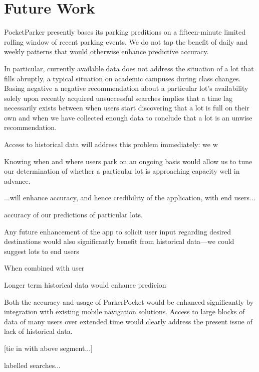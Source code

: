 \section{Future Work}
\label{sec-future}



PocketParker presently bases its parking preditions on a fifteen-minute 
limited rolling window of recent parking events. We do not tap the benefit
of daily and weekly patterns that would otherwise enhance predictive accuracy.

In particular, currently available data does not address the situation of a
lot that fills abruptly, a typical situation on academic campuses during
class changes. Basing negative a negative recommendation about a particular
lot's availability solely upon recently acquired unsuccessful searches implies
that a time lag necessarily exists between when users start discovering that
a lot is full on their own and when we have collected enough data to conclude
that a lot is an unwise recommendation.

Access to historical data will address this problem immediately:  we w

Knowing when and where users park on an ongoing basis would allow us to tune
our determination of whether a particular lot is approaching capacity well
in advance.  


...will enhance accuracy, and hence credibility of the application, with end users...

accuracy of our predictions of particular lots.

Any future enhancement of the app to solicit user input regarding desired
destinations would also significantly benefit from historical data---we
could suggest lots to end users 

When combined with user

Longer term historical data
would enhance predicion




Both the accuracy and usage of ParkerPocket would be enhanced significantly
by integration with existing mobile navigation solutions.  Access to large blocks of data of many users over extended time
would clearly address the present issue of lack of historical data.

[tie in with above segment...]

labelled searches...







